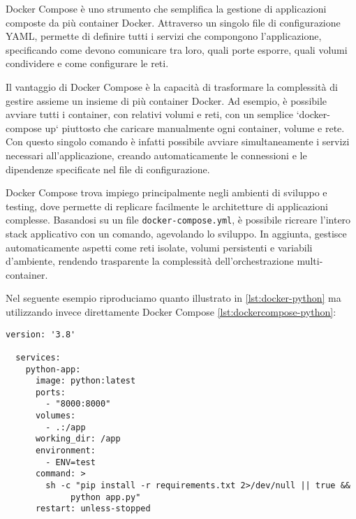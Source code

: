 Docker Compose è uno strumento che semplifica la gestione di applicazioni composte da più container Docker. Attraverso un singolo file di configurazione YAML, permette di definire tutti i servizi che compongono l'applicazione, specificando come devono comunicare tra loro, quali porte esporre, quali volumi condividere e come configurare le reti.

Il vantaggio di Docker Compose è la capacità di trasformare la complessità di gestire assieme un insieme di più container Docker. Ad esempio, è possibile avviare tutti i container, con relativi volumi e reti, con un semplice `docker-compose up` piuttosto che caricare manualmente ogni container, volume e rete. Con questo singolo comando è infatti possibile avviare simultaneamente i servizi necessari all'applicazione, creando automaticamente le connessioni e le dipendenze specificate nel file di configurazione.

Docker Compose trova impiego principalmente negli ambienti di sviluppo e testing, dove permette di replicare facilmente le architetture di applicazioni complesse. Basandosi su un file \texttt{docker-compose.yml}, è possibile ricreare l'intero stack applicativo con un comando, agevolando lo sviluppo. In aggiunta, gestisce automaticamente aspetti come reti isolate, volumi persistenti e variabili d'ambiente, rendendo trasparente la complessità dell'orchestrazione multi-container.

Nel seguente esempio riproduciamo quanto illustrato in \ref{lst:docker-python} ma utilizzando invece direttamente Docker Compose \ref{lst:dockercompose-python}:

\begin{lstlisting}[caption={Docker Compose Python}, label=lst:dockercompose-python]
  version: '3.8'

  services:
    python-app:
      image: python:latest
      ports:
        - "8000:8000"
      volumes:
        - .:/app
      working_dir: /app
      environment:
        - ENV=test
      command: >
        sh -c "pip install -r requirements.txt 2>/dev/null || true &&
             python app.py"
      restart: unless-stopped
\end{lstlisting}
